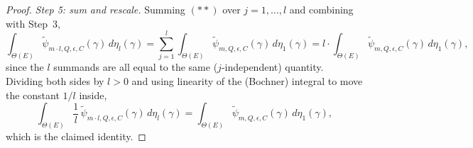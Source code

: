 \begin{proof}
  \emph{Step 5: sum and rescale.} Summing $(\ast\ast)$ over $j=1,\dotsc,l$ and combining with
  Step~3,
  \[
    \int_{\Theta(E)} \tilde\psi_{m\cdot l,Q,\epsilon,C}(\gamma) \, d\eta_l(\gamma)
    = \sum_{j=1}^l \int_{\Theta(E)} \tilde\psi_{m,Q,\epsilon,C}(\gamma) \, d\eta_1(\gamma)
    = l \cdot \int_{\Theta(E)} \tilde\psi_{m,Q,\epsilon,C}(\gamma) \, d\eta_1(\gamma)
    ,
  \]
  since the $l$ summands are all equal to the same ($j$-independent) quantity. Dividing both
  sides by $l>0$ and using linearity of the (Bochner) integral to move the constant $1/l$ inside,
  \[
    \int_{\Theta(E)} \frac1l\,\tilde\psi_{m\cdot l,Q,\epsilon,C}(\gamma) \, d\eta_l(\gamma)
    = \int_{\Theta(E)} \tilde\psi_{m,Q,\epsilon,C}(\gamma) \, d\eta_1(\gamma)
    ,
  \]
  which is the claimed identity.
\end{proof}
